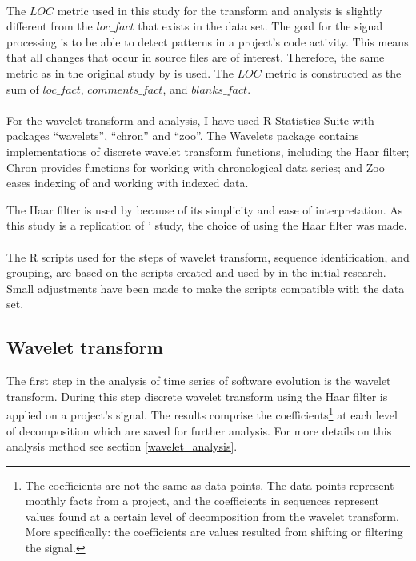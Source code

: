 

\paragraph{}
The $LOC$ metric used in this study for the transform and analysis is slightly
different from the $loc\_fact$ that exists in the data set. The goal for the
signal processing is to be able to detect patterns in a project's code activity.
This means that all changes that occur in source files are of interest.
Therefore, the same metric as in the original study by \citet{karus2013} is
used. The $LOC$ metric is constructed as the sum of $loc\_fact$,
$comments\_fact$, and $blanks\_fact$.

\paragraph{}
For the wavelet transform and analysis, I have used R Statistics Suite
with packages ``wavelets'', ``chron'' and ``zoo''. The Wavelets package
contains implementations of discrete wavelet transform functions, including
the Haar filter; Chron provides functions for working with chronological data
series; and Zoo eases indexing of and working with indexed data.

The Haar filter is used by \citet{karus2013} because of its simplicity and ease
of interpretation. As this study is a replication of \citeauthor{karus2013}'
study, the choice of using the Haar filter was made.

\paragraph{}
The R scripts used for the steps of wavelet transform, sequence identification,
and grouping, are based on the scripts created and used by
\citeauthor{karus2013} in the initial research. Small adjustments have been
made to make the scripts compatible with the data set.

\subsection{Wavelet transform}
The first step in the analysis of time series of software evolution is the
wavelet transform. During this step discrete wavelet transform using the Haar
filter is applied on a project's signal. The results comprise the
coefficients\footnote{The coefficients are not the same as data points. The
data points represent monthly facts from a project, and the coefficients in
sequences represent values found at a certain level of decomposition from the
wavelet transform. More specifically: the coefficients are values resulted from
shifting or filtering the signal.} at each level of decomposition which are
saved for further analysis. For more details on this analysis method see
section \ref{wavelet_analysis}.

